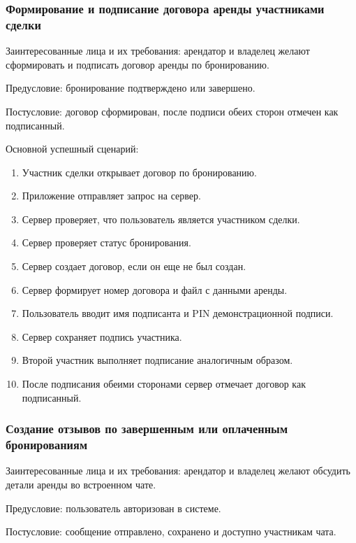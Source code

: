 \subsubsection{Формирование и подписание договора аренды участниками сделки}
Заинтересованные лица и их требования: арендатор и владелец желают сформировать и подписать договор аренды по бронированию.

Предусловие: бронирование подтверждено или завершено.

Постусловие: договор сформирован, после подписи обеих сторон отмечен как подписанный.

Основной успешный сценарий:
\begin{enumerate}
    \item Участник сделки открывает договор по бронированию.
    \item Приложение отправляет запрос на сервер.
    \item Сервер проверяет, что пользователь является участником сделки.
    \item Сервер проверяет статус бронирования.
    \item Сервер создает договор, если он еще не был создан.
    \item Сервер формирует номер договора и файл с данными аренды.
    \item Пользователь вводит имя подписанта и PIN демонстрационной подписи.
    \item Сервер сохраняет подпись участника.
    \item Второй участник выполняет подписание аналогичным образом.
    \item После подписания обеими сторонами сервер отмечает договор как подписанный.
\end{enumerate}
\subsubsection{Создание отзывов по завершенным или оплаченным бронированиям}
Заинтересованные лица и их требования: арендатор и владелец желают обсудить детали аренды во встроенном чате.

Предусловие: пользователь авторизован в системе.

Постусловие: сообщение отправлено, сохранено и доступно участникам чата.

